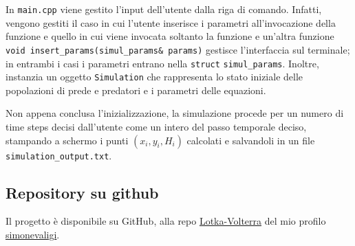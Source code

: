 In \verb|main.cpp| viene gestito l'input dell'utente dalla riga di comando.
Infatti, vengono gestiti il caso in cui l'utente inserisce i parametri all'invocazione della funzione e quello in cui viene invocata soltanto la funzione e un'altra funzione \verb|void insert_params(simul_params& params)| gestisce l'interfaccia sul terminale; in entrambi i casi i parametri entrano nella \verb|struct| \verb|simul_params|.
Inoltre, instanzia un oggetto \verb|Simulation| che rappresenta lo stato iniziale delle popolazioni di prede e predatori e i parametri delle equazioni.

Non appena conclusa l'inizializzazione, la simulazione procede per un numero di time steps decisi dall'utente come un intero del passo temporale deciso, stampando a schermo i punti $(x_i, y_i, H_i)$ calcolati e salvandoli in un file \verb|simulation_output.txt|.

\subsection{Repository su github}
Il progetto è disponibile su GitHub, alla repo \href{https://github.com/simonevaligi/Lotka-Volterra}{Lotka-Volterra} del mio profilo \href{https://github.com/simonevaligi}{simonevaligi}.